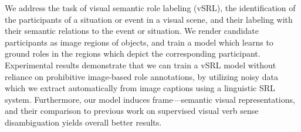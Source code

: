 We address the task of visual semantic role labeling (vSRL), the identification of the participants of a situation or event in a visual scene, and their labeling with their semantic relations to the event or situation. We render candidate participants as image regions of objects, and train a model which learns to ground roles in the regions which depict the corresponding participant. Experimental results demonstrate that we can train a vSRL model without reliance on prohibitive image-based role annotations, by utilizing noisy data which we extract automatically from image captions using a linguistic SRL system. Furthermore, our model induces frame---semantic visual representations, and their comparison to previous work on supervised visual verb sense disambiguation yields overall better results.
